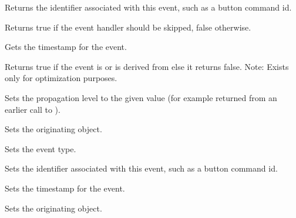 

Returns the identifier associated with this event, such as a button command id.



Returns true if the event handler should be skipped, false otherwise.



Gets the timestamp for the event.

\label{wxeventiscommandevent}


Returns true if the event is or is derived from
 else it returns false.
Note: Exists only for optimization purposes.


\label{wxeventresumepropagation}


Sets the propagation level to the given value (for example returned from an
earlier call to ).




Sets the originating object.



Sets the event type.



Sets the identifier associated with this event, such as a button command id.



Sets the timestamp for the event.

Sets the originating object.

